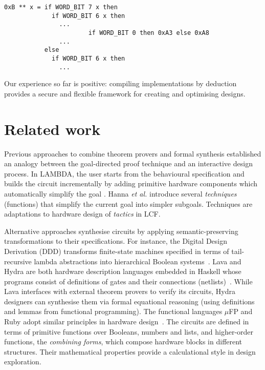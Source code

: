 \documentclass{llncs}
\begin{document}
\vspace*{-2mm}

{\footnotesize\baselineskip10pt\begin{verbatim}
0xB ** x = if WORD_BIT 7 x then
             if WORD_BIT 6 x then 
               ...
                       if WORD_BIT 0 then 0xA3 else 0xA8
               ...
           else
             if WORD_BIT 6 x then
               ...
\end{verbatim}}

\vspace*{-2mm}

Our experience so far is positive: compiling implementations by
deduction provides a secure and flexible framework for creating and
optimising designs.

\section{Related work}
\label{secRelatedWork}
Previous approaches to combine theorem provers 
and formal synthesis established an analogy between
the goal-directed proof technique and an interactive 
design process. In LAMBDA, the user starts from the behavioural
specification and builds the circuit incrementally
by adding primitive hardware components
which automatically simplify the goal \cite{Fou89}.
Hanna {\em et al.\/} \cite{HLD89} introduce
several {\em techniques\/} (functions) that
simplify the current goal into simpler subgoals.
Techniques are adaptations to hardware design
of {\em tactics\/} in LCF.

Alternative approaches synthesise circuits
by applying semantic-preserving transformations
to their specifications. For instance,
the Digital Design Derivation (DDD) transforms
finite-state machines specified in terms of
tail-recursive lambda abstractions into hierarchical
Boolean systems~\cite{Johnson90}. Lava and Hydra
are both hardware description languages embedded
in Haskell whose programs
consist of definitions of gates and their 
connections (netlists)~\cite{BCSS99,OD02}. While Lava interfaces with
external theorem provers to verify its circuits,
Hydra designers can synthesise them
via formal equational reasoning
(using definitions and lemmas from functional programming).
The functional languages $\mu$FP and Ruby
adopt similar principles in hardware design~\cite{JS90,She84}.
The circuits are defined in terms of primitive
functions over Booleans, numbers and lists, and
higher-order functions, the {\em combining forms\/},
which compose hardware blocks in different
structures. Their mathematical properties provide
a calculational style in design exploration.
\end{document}
